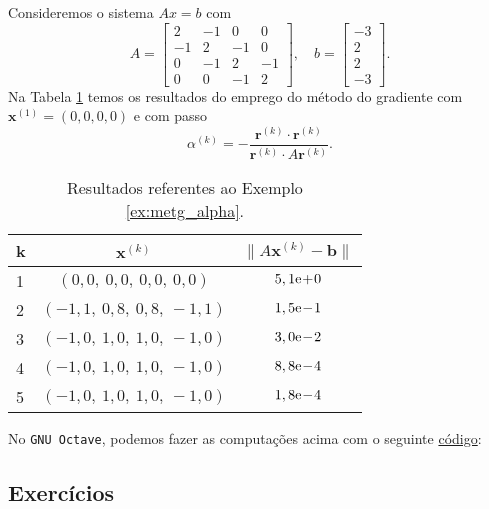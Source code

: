 \begin{ex}\label{ex:metg_alpha}
  Consideremos o sistema $Ax = b$ com
  \begin{equation}
    A =
    \begin{bmatrix}
      2 & -1 & 0 & 0\\
      -1 & 2 & -1 & 0\\
      0 & -1 & 2 & -1 \\
      0 & 0 & -1 & 2
    \end{bmatrix},\quad
    b =
    \begin{bmatrix}
      -3\\
      2\\
      2\\
      -3
    \end{bmatrix}.
  \end{equation}
  Na Tabela \ref{tab:metg_alpha} temos os resultados do emprego do método do gradiente com $\pmb{x}^{(1)} = (0, 0, 0, 0)$ e com passo
  \begin{equation}
    \alpha^{(k)} = - \frac{\pmb{r}^{(k)}\cdot\pmb{r}^{(k)}}{\pmb{r}^{(k)}\cdot A\pmb{r}^{(k)}}.
\end{equation}

  \begin{table}[h!]
    \centering
    \caption{Resultados referentes ao Exemplo \ref{ex:metg_alpha}.}
    \label{tab:metg_alpha}
    \begin{tabular}{l|c|c}
      k & $\pmb{x}^{(k)}$ & $\|A\pmb{x}^{(k)}-\pmb{b}\|$\\\hline
      1 & $(0,0,~0,0,~0,0,~0,0)$ & $5,1\mathrm{e}\!+\!0$\\
      2 & $(-1,1,~0,8,~0,8,~-1,1)$ & $1,5\mathrm{e}\!-\!1$\\
      3 & $(-1,0,~1,0,~1,0,~-1,0)$ & $3,0\mathrm{e}\!-\!2$\\
      4 & $(-1,0,~1,0,~1,0,~-1,0)$ & $8,8\mathrm{e}\!-\!4$\\
      5 & $(-1,0,~1,0,~1,0,~-1,0)$ & $1,8\mathrm{e}\!-\!4$\\\hline
    \end{tabular}
  \end{table}

\ifisoctave
No \verb+GNU Octave+, podemos fazer as computações acima com o seguinte \href{https://github.com/phkonzen/notas/blob/master/src/MatematicaNumerica/cap_sl_iter/dados/ex_metg_alpha/ex_metg_alpha.m}{código}:

\fi
\end{ex}

\subsection*{Exercícios}

